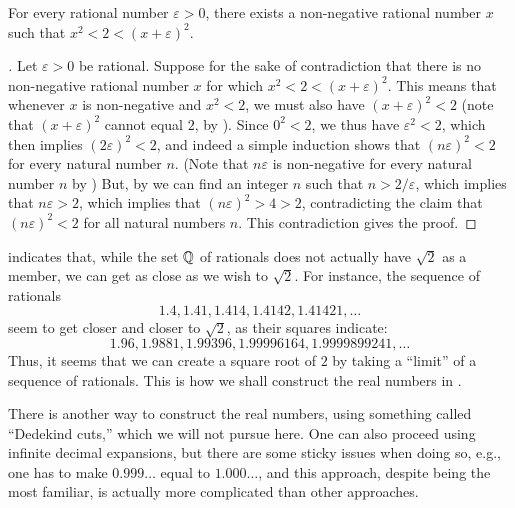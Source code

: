 \begin{prop}\label{i:4.4.5}
  For every rational number \(\varepsilon > 0\), there exists a non-negative rational number \(x\) such that \(x^2 < 2 < (x + \varepsilon)^2\).
\end{prop}

\begin{proof}[]
  Let \(\varepsilon > 0\) be rational.
  Suppose for the sake of contradiction that there is no non-negative rational number \(x\) for which \(x^2 < 2 < (x + \varepsilon)^2\).
  This means that whenever \(x\) is non-negative and \(x^2 < 2\), we must also have \((x + \varepsilon)^2 < 2\)
  (note that \((x + \varepsilon)^2\) cannot equal \(2\), by ).
  Since \(0^2 < 2\), we thus have \(\varepsilon^2 < 2\), which then implies \((2\varepsilon)^2 < 2\), and indeed a simple induction shows that \((n\varepsilon)^2 < 2\) for every natural number \(n\).
  (Note that \(n\varepsilon\) is non-negative for every natural number \(n\) by )
  But, by  we can find an integer \(n\) such that \(n > 2 / \varepsilon\), which implies that \(n\varepsilon > 2\), which implies that \((n\varepsilon)^2 > 4 > 2\), contradicting the claim that \((n\varepsilon)^2 < 2\) for all natural numbers \(n\).
  This contradiction gives the proof.
\end{proof}

\begin{note}
   indicates that, while the set \(\mathbb{Q}\) of rationals does not actually have \(\sqrt{2}\) as a member, we can get as close as we wish to \(\sqrt{2}\).
  For instance, the sequence of rationals
  \[
    1.4, 1.41, 1.414, 1.4142, 1.41421, \dots
  \]
  seem to get closer and closer to \(\sqrt{2}\), as their squares indicate:
  \[
    1.96, 1.9881, 1.99396, 1.99996164, 1.9999899241, \dots
  \]
  Thus, it seems that we can create a square root of \(2\) by taking a ``limit'' of a sequence of rationals.
  This is how we shall construct the real numbers in .
\end{note}

\begin{note}
  There is another way to construct the real numbers, using something called ``Dedekind cuts,'' which we will not pursue here.
  One can also proceed using infinite decimal expansions, but there are some sticky issues when doing so, e.g., one has to make \(0.999\dots\) equal to \(1.000\dots\), and this approach, despite being the most familiar, is actually more complicated than other approaches.
\end{note}

